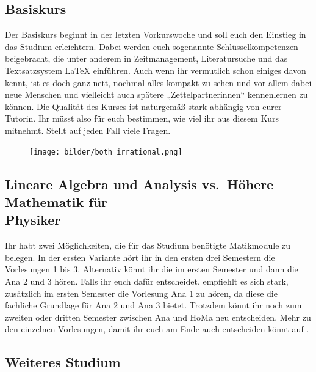 \subsection{Basiskurs}
Der Basiskurs beginnt in der letzten Vorkurswoche und soll euch den Einstieg in das Studium erleichtern. Dabei werden euch sogenannte Schlüsselkompetenzen beigebracht, die unter anderem in Zeitmanagement, Literatursuche und das Textsatzsystem \LaTeX{} einführen. Auch wenn ihr vermutlich schon einiges davon kennt, ist es doch ganz nett, nochmal alles kompakt zu sehen und vor allem dabei neue Menschen und vielleicht auch spätere „Zettelpartnerinnen“ kennenlernen zu können. Die Qualität des Kurses ist naturgemäß stark abhängig von eurer Tutorin. Ihr müsst also für euch bestimmen, wie viel ihr aus diesem Kurs mitnehmt. Stellt auf jeden Fall viele Fragen.

\begin{figure}[b]
	\centering
	\texttt{[image: bilder/both\_irrational.png]}
\end{figure}


\subsection{Lineare Algebra und Analysis vs.~Höhere Mathematik für \\Physiker}
Ihr habt zwei Möglichkeiten, die für das Studium benötigte Matikmodule zu belegen.
In der ersten Variante hört ihr in den ersten drei Semestern die Vorlesungen  1 bis 3. Alternativ könnt ihr die  im ersten Semester und dann die \gls{Ana} 2 und 3 hören. Falls ihr euch dafür entscheidet, empfiehlt es sich stark, zusätzlich im ersten Semester die Vorlesung \gls{Ana} 1 zu hören, da diese die fachliche Grundlage für \gls{Ana} 2 und \gls{Ana} 3 bietet. Trotzdem könnt ihr noch zum zweiten oder dritten Semester zwischen \gls{Ana} und \gls{HoMa} neu entscheiden. Mehr zu den einzelnen Vorlesungen, damit ihr euch am Ende auch entscheiden könnt auf .

\subsection{Weiteres Studium}

